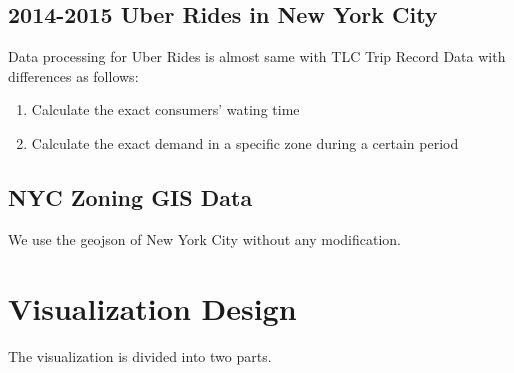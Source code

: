 \documentclass{article}
\begin{document}
            \subsection{2014-2015 Uber Rides in New York City}
                Data processing for Uber Rides is almost same with TLC Trip Record Data with differences as follows:
                \begin{enumerate}
                    \item Calculate the exact consumers' wating time
                    \item Calculate the exact demand in a specific zone during a certain period
                \end{enumerate}
            \subsection{NYC Zoning GIS Data}
                We use the geojson of New York City without any modification.
        \section{Visualization Design}
                The visualization is divided into two parts. 
                
\end{document}
